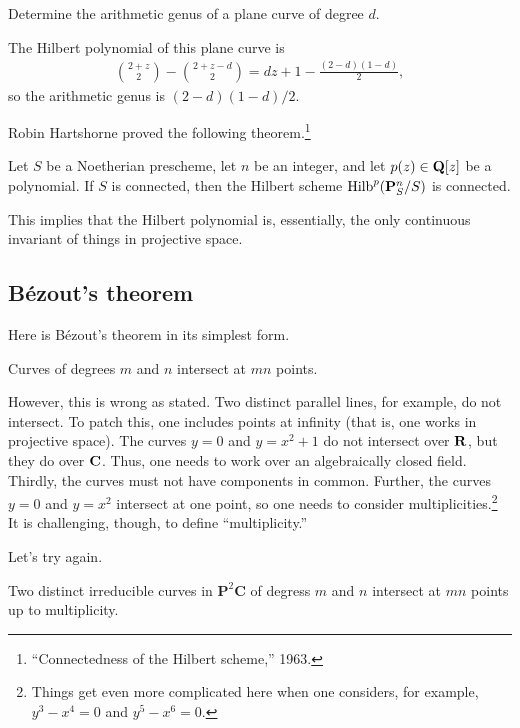 \documentclass [11 pt, oneside] {article}
\begin{document}
\begin{problem}
	Determine the arithmetic genus of a plane curve of degree $d$.
\end{problem}

The Hilbert polynomial of this plane curve is
\begin{align*}
	\binom{2+z}{2} - \binom{2+z-d}{2} = dz + 1 - \frac{(2-d) (1-d)}{2},
\end{align*}
so the arithmetic genus is $(2-d) (1-d)/2$.

Robin Hartshorne proved the following theorem.\footnote{``Connectedness of the Hilbert scheme,'' 1963.}

\begin{theorem}[Hartshorne]\label{}\index{}\text{}
Let $S$ be a Noetherian prescheme, let $n$ be an integer, and let $p(z)\in\mathbf Q [z]$ be a polynomial. If $S$ is connected, then the Hilbert scheme $\operatorname{Hilb}^p(\mathbf{P}^n_S/S)$ is connected.
\end{theorem}

This implies that the Hilbert polynomial is, essentially, the only continuous invariant of things in projective space.

\subsection{B\'ezout's theorem}
Here is B\'ezout's theorem in its simplest form.
\begin{theorem}[B\'ezout]\label{b_1}\text{}
Curves of degrees $m$ and $n$ intersect at $mn$ points.
\end{theorem}
However, this is wrong as stated. Two distinct parallel lines, for example, do not intersect. To patch this, one includes points at infinity (that is, one works in projective space). The curves $y=0$ and $y=x^2+1$ do not intersect over $\mathbf R$, but they do over $\mathbf C$. Thus, one needs to work over an algebraically closed field. Thirdly, the curves must not have components in common. Further, the curves $y=0$ and $y=x^2$ intersect at one point, so one needs to consider multiplicities.\footnote{Things get even more complicated here when one considers, for example, $y^3-x^4=0$ and $y^5 - x^6=0$.} It is challenging, though, to define ``multiplicity.''

Let's try again.

\begin{theorem}[B\'ezout]\label{b_2}\text{}
Two distinct irreducible curves in $\mathbf{P}^2\mathbf{C}$ of degress $m$ and $n$ intersect at $mn$ points up to multiplicity.
\end{theorem}
\end{document}
